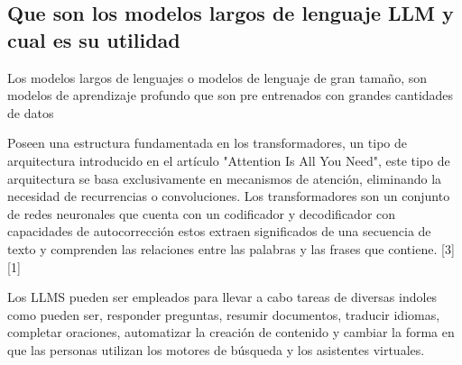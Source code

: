 \documentclass{article}
\begin{document}





\subsection{Que son los modelos largos de lenguaje LLM y cual es su utilidad}

Los modelos largos de lenguajes o modelos de lenguaje de gran tama{\~{n}}o, son modelos de aprendizaje profundo que son pre entrenados con grandes cantidades de datos 

Poseen una estructura fundamentada en los transformadores, un tipo de arquitectura introducido en el art{\'{i}}culo "Attention Is All You Need", este tipo de arquitectura se basa exclusivamente en mecanismos de atenci{\'{o}}n, eliminando la necesidad de recurrencias o convoluciones. Los transformadores son un conjunto de redes neuronales que cuenta con un codificador y decodificador con capacidades de autocorrecci{\'{o}}n estos extraen significados de una secuencia de texto y comprenden las relaciones entre las palabras y las frases que contiene. {[}3{]}{[}1{]}

Los LLMS pueden ser empleados para llevar a cabo tareas de diversas indoles como pueden ser, responder preguntas, resumir documentos, traducir idiomas, completar oraciones, automatizar la creaci{\'{o}}n de contenido y cambiar la forma en que las personas utilizan los motores de b{{\'{u}}}squeda y los asistentes virtuales.
\end{document}
